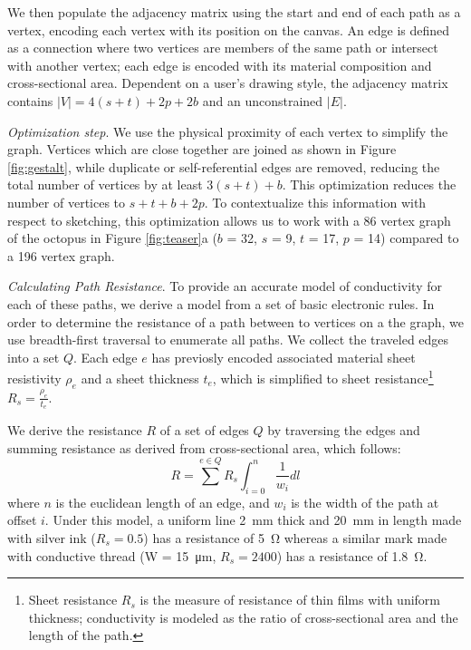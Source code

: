 \documentclass{sigchi}
\begin{document}
    We then populate the adjacency matrix using the start and end of each path as a vertex, encoding each vertex with its position on the canvas. An edge is defined as a connection where two vertices are members of the same path or intersect with another vertex; each edge is encoded with its material composition and cross-sectional area.
     Dependent on  a user's drawing style, the adjacency matrix contains $|V| = 4(s + t) + 2p + 2b $ and an unconstrained $|E|$.
 
    \textit{Optimization step}. We use the physical proximity of each vertex to simplify the graph. Vertices which are close together are joined as shown in Figure \ref{fig:gestalt}, while duplicate or self-referential edges are removed, reducing the total number of vertices by at least $3(s + t) + b$. This optimization reduces the number of vertices to $s + t + b + 2p$. To contextualize this information with respect to sketching, this optimization allows us to work with a 86 vertex graph of the octopus in Figure \ref{fig:teaser}a ($b$ = 32, $s$ = 9, $t$ = 17, $p$ = 14) compared to a 196 vertex graph.

      
    \textit{Calculating Path Resistance}. To provide an accurate model of conductivity for each of these paths, we derive a model from a set of basic electronic rules. In order to determine the resistance of a path between to vertices on a the graph, we use breadth-first traversal to enumerate all paths.
    We collect the traveled edges into a set $Q$. 
    Each edge $e$ has previosly encoded associated material sheet resistivity $\rho_e$ and a sheet thickness $t_e$, which is simplified to sheet resistance\footnote{Sheet resistance $R_s$ is the measure of resistance of thin films with uniform thickness; conductivity is modeled as the ratio of cross-sectional area and the length of the path.} $R_s = \frac{\rho_e}{t_e}$.
    
    We derive the resistance $R$ of a set of edges $Q$ by traversing the edges and summing resistance as derived from cross-sectional area, which follows:
        \begin{equation}
            R =  \sum^{e \in Q} R_s \int_{i=0}^{n}  \frac{1}{w_i} dl
        \label{eq:resistance}
        \end{equation}
      where $n$ is the euclidean length of an edge, and $w_i$ is the width of the path at offset $i$. Under this model, a uniform line \SI{2}{\milli\metre} thick and \SI{20}{\milli\metre} in length made with silver ink ($R_s = 0.5$) has a resistance of \SI{5}{\ohm} whereas a similar mark made with conductive thread (W = \SI{15}{\micro\metre}, $R_s = 2400$) has a resistance of \SI{1.8}{\ohm}.
\end{document}
